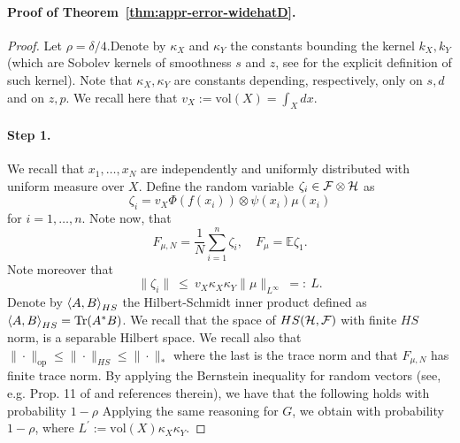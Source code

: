 \paragraph{Proof of Theorem~\ref{thm:appr-error-widehatD}.}
\begin{proof}
Let $\rho = \delta/4$.Denote by $\kappa_X$ and $\kappa_Y$ the constants bounding the kernel $k_X, k_Y$ (which are Sobolev kernels of smoothness $s$ and $z$, see \citet{wendland2004scattered} for the explicit definition of such kernel). Note that $\kappa_X, \kappa_Y$ are constants depending, respectively, only on $s, d$ and on $z, p$.
We recall here that $v_X := \textrm{vol}(X) = \int_X dx$.

\paragraph{Step 1. }
We recall that $x_1,\dots,x_N$ are independently and uniformly distributed with uniform measure over $X$.
Define the random variable $\zeta_i \in {\cal F} \otimes \mathcal H$ as
$$\zeta_i = v_X \Phi(f(x_i)) \otimes \psi(x_i) \mu(x_i)$$
for $i=1,\dots,n$. Note now, that
$$F_{\mu, N} = \frac{1}{N} \sum_{i=1}^n \zeta_i, \quad F_\mu = \mathbb{E} \zeta_1.$$
Note moreover that
$$\|\zeta_i\| ~\leq~ v_X \kappa_X \kappa_Y \|\mu\|_{L^\infty} ~=:~ L.$$
Denote by $\left\langle{A},{B}\right\rangle_{HS}$ the Hilbert-Schmidt inner product defined as $\left\langle{A},{B}\right\rangle_{HS} = \operatorname{Tr}(A^*B)$. We recall that the space of $HS(\mathcal H,{\cal F})$ with finite $HS$ norm, is a separable Hilbert space. We recall also that $\|\cdot\|_{\mathrm{op}} \leq \|\cdot\|_{HS} \leq \|\cdot\|_*$ where the last is the trace norm and that $F_{\mu, N}$ has finite trace norm.
By applying the Bernstein inequality for random vectors (see, e.g. Prop. 11 of \citet{rudi2015less} and references therein), we have that the following holds with probability $1-\rho$
Applying the same reasoning for $G$, we obtain
with probability $1-\rho$, where $L^\prime := \textrm{vol}(X)\kappa_X \kappa_Y.$


\end{proof}
